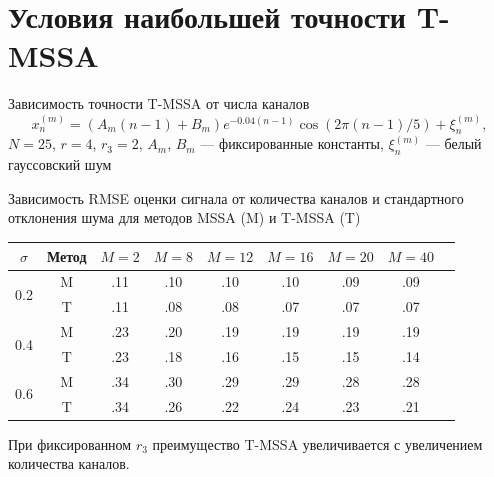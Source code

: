\documentclass[pdf, unicode, 10pt, notheorems, handout]{beamer}
\newcommand{\bluetext}[1]{{\usebeamercolor[fg]{bluetext_color}#1}}
\begin{document}
\section{Условия наибольшей точности T-MSSA}
\begin{frame}{Зависимость точности T-MSSA от числа каналов}
  \[
    x_n^{(m)} = (A_m (n - 1) + B_m) e^{-0.04 (n - 1)}\cos (2 \pi (n -
    1) / 5) + \xi_n^{(m)},
  \]
  $N = 25$, $r=4$, $r_3 = 2$, $A_m$, $B_m$ --- фиксированные
  константы, $\xi_n^{(m)}$ --- белый гауссовский шум

  \begin{table}[!ht]
    \centering
    \small
    \bluetext{Зависимость RMSE оценки сигнала от количества каналов и
    стандартного отклонения шума для методов MSSA (M) и T-MSSA (T)}
    \begin{tabular}{c|c|ccccccc}
      $\sigma$ & Метод & $M = 2$ & $M = 8$ & $M = 12$ & $M = 16$ & $M
      = 20$ & $M = 40$ \\ \hline
      \multirow{2}{1.3em}{0.2} & M & .11 & .10 &
      .10 & .10 & .09 & .09 \\
      & T & .11 & .08 & .08 & .07 & .07
      & .07 \\
      \hline
      \multirow{2}{1.3em}{0.4} & M & .23 & .20 &
      .19 & .19 & .19 & .19 \\
      & T & .23 & .18 & .16 & .15 & .15
      & .14 \\
      \hline
      \multirow{2}{1.3em}{0.6} & M & .34  & .30 &
      .29 & .29 & .28 & .28 \\
      & T & .34 & .26 & .22 & .24 & .23
      & .21 \\
      \hline
    \end{tabular}
  \end{table}

  При фиксированном $r_3$ преимущество T-MSSA увеличивается с
  увеличением количества каналов.
\end{frame}
\end{document}
